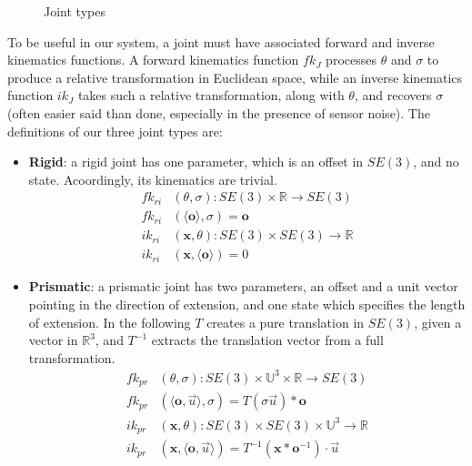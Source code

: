 \documentclass[letterpaper, 10 pt, conference]{ieeeconf}  %
\def\xvec{\vec}          \def\xvecstr{with an arrow}
\def\xse{\bm}            \def\xsestr{in boldface}
\begin{document}
\begin{figure}[ht]
  \hfill
  \caption{Joint types}
  \label{fig:joint-types}
\end{figure}

To be useful in our system, a joint must have associated forward and inverse kinematics functions. A forward kinematics function $fk_J$ processes $\theta$ and $\sigma$ to produce a relative transformation in Euclidean space, while an inverse kinematics function $ik_J$ takes such a relative transformation, along with $\theta$, and recovers $\sigma$ (often easier said than done, especially in the presence of sensor noise). The definitions of our three joint types are:

\begin{itemize}
  \item \textbf{Rigid}: a rigid joint has one parameter, which is an offset in $SE(3)$, and no state. Acoordingly, its kinematics are trivial.
    \begin{align}
      fk_{ri}&(\theta, \sigma) : SE(3) \times \mathbb{R} \longrightarrow SE(3) \\
      fk_{ri}&(\langle \xse{o} \rangle, \sigma) = \xse{o} \nonumber\\
      ik_{ri}&(\xse{x}, \theta) : SE(3) \times SE(3) \longrightarrow \mathbb{R} \\
      ik_{ri}&(\xse{x}, \langle \xse{o} \rangle) = 0 \nonumber
    \end{align}
  \item \textbf{Prismatic}: a prismatic joint has two parameters, an offset and a unit vector pointing in the direction of extension, and one state which specifies the length of extension. In the following $T$ creates a pure translation in $SE(3)$, given a vector in $\mathbb{R}^3$, and $T^{-1}$ extracts the translation vector from a full transformation.
    \begin{align}
      fk_{pr}&(\theta, \sigma) : SE(3) \times \mathbb{U}^3 \times \mathbb{R} \longrightarrow SE(3) \\
      fk_{pr}&(\langle \xse{o}, \xvec{u} \rangle, \sigma) = T(\sigma \xvec{u}) * \xse{o} \nonumber\\
      ik_{pr}&(\xse{x}, \theta) : SE(3) \times SE(3) \times \mathbb{U}^3 \longrightarrow \mathbb{R} \\
      ik_{pr}&(\xse{x}, \langle \xse{o}, \xvec{u} \rangle) = T^{-1}(\xse{x}*\xse{o}^{-1}) \cdot \xvec{u} \nonumber

\end{align}
\end{itemize}
\end{document}
